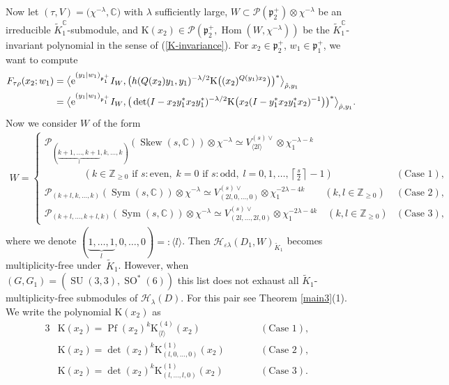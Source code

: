 \documentclass[pdftex]{sigma}
\numberwithin{equation}{section}
\newcommand{\BZ}{\mathbb{Z}}
\newcommand{\BC}{\mathbb{C}}
\newcommand{\fp}{\mathfrak{p}}
\newcommand{\cH}{\mathcal{H}}
\newcommand{\cP}{\mathcal{P}}
\newcommand{\rK}{\mathrm{K}}
\newcommand{\Hom}{\operatorname{Hom}}
\newcommand{\Pf}{\operatorname{Pf}}
\newcommand{\Sym}{\operatorname{Sym}}
\newcommand{\Skew}{\operatorname{Skew}}
\begin{document}
Now let $(\tau,V)=\big(\chi^{-\lambda},\BC\big)$ with $\lambda$ sufficiently large,
$W\subset\cP(\fp^+_2)\otimes\chi^{-\lambda}$ be an irreducible $\tilde{K}^\BC_1$-submodule,
and $\rK(x_2)\in \cP(\fp^+_2,\Hom(W,\chi^{-\lambda}))$ be the $\tilde{K}^\BC_1$-invariant polynomial in the sense of (\ref{K-invariance}).
For $x_2\in\fp^+_2$, $w_1\in\fp^+_1$, we want to compute
\begin{align*}
F_{\tau\rho}(x_2;w_1)
&=\big\langle {\rm e}^{(y_1|w_1)_{\fp^+_1}}I_W,
\big(h(Q(x_2)y_1,y_1)^{-\lambda/2}\rK\big((x_2)^{Q(y_1)x_2}\big)\big)^*\big\rangle_{\hat{\rho},y_1} \\
&=\big\langle {\rm e}^{(y_1|w_1)_{\fp^+_1}}I_W,
\big(\det(I-x_2y_1^*x_2y_1^*)^{-\lambda/2}\rK\big(x_2(I-y_1^*x_2y_1^*x_2)^{-1}\big)\big)^*\big\rangle_{\hat{\rho},y_1}.
\end{align*}
Now we consider $W$ of the form
\begin{gather*} W=\begin{cases}\cP_{(\underbrace{\scriptstyle k+1,\ldots,k+1}_l,k,\ldots,k)}(\Skew(s,\BC))\otimes\chi^{-\lambda}
\simeq V_{\langle 2l\rangle}^{(s)\vee}\otimes\chi_1^{-\lambda-k} &\\
\hspace{48pt} \left(k\in\BZ_{\ge 0}\text{ if }s\colon \text{even},\; k=0\text{ if }s\colon \text{odd},\;
l=0,1,\ldots,\left\lceil\frac{s}{2}\right\rceil-1\right)&(\text{Case }1),\\
\cP_{(k+l,k,\ldots,k)}(\Sym(s,\BC))\otimes\chi^{-\lambda}
\simeq V_{(2l,0,\ldots,0)}^{(s)\vee}\otimes\chi_1^{-2\lambda-4k} \qquad (k,l\in\BZ_{\ge 0})&(\text{Case }2),\\
\cP_{(k+l,\ldots,k+l,k)}(\Sym(s,\BC))\otimes\chi^{-\lambda}
\simeq V_{(2l,\ldots,2l,0)}^{(s)\vee}\otimes\chi_1^{-2\lambda-4k} \quad (k,l\in\BZ_{\ge 0})&(\text{Case }3),\end{cases} \end{gather*}
where we denote $(\underbrace{1,\ldots,1}_l,0,\ldots,0)=:\langle l\rangle$.
Then $\cH_{\varepsilon\lambda}(D_1,W)_{\tilde{K}_1}$ becomes multiplicity-free under~$\tilde{K}_1$.
However, when $(G,G_1)=(\operatorname{SU}(3,3),\operatorname{SO}^*(6))$ this list does not exhaust all $\tilde{K}_1$-multipli\-city-free submodules of $\cH_\lambda(D)$.
For this pair see Theorem \ref{main3}(1).
We write the polynomial $\rK(x_2)$ as
\begin{alignat*}{3}
&\rK(x_2)=\Pf(x_2)^k \rK_{\langle l\rangle}^{(4)}(x_2)\qquad & &(\text{Case }1),&\\
&\rK(x_2)=\det(x_2)^k \rK_{(l,0,\ldots,0)}^{(1)}(x_2)\qquad & &(\text{Case }2),&\\
&\rK(x_2)=\det(x_2)^k \rK_{(l,\ldots,l,0)}^{(1)}(x_2)\qquad & &(\text{Case }3).&
\end{alignat*}
\end{document}
